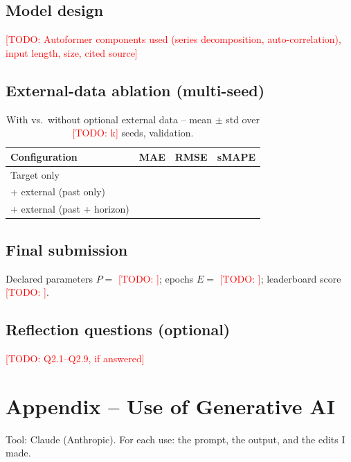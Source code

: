 \documentclass[11pt,a4paper]{article}
\newcommand{\todo}[1]{\textcolor{red}{[TODO: #1]}}
\begin{document}
\subsection*{Model design}
\todo{Autoformer components used (series decomposition, auto-correlation), input length, size, cited source}

\subsection*{External-data ablation (multi-seed)}
\begin{table}[H]\centering\small
\caption{With vs.\ without optional external data -- mean $\pm$ std over \todo{k} seeds, validation.}
\begin{tabular}{lccc}
\toprule
Configuration & MAE & RMSE & sMAPE\\
\midrule
Target only & & & \\
+ external (past only) & & & \\
+ external (past + horizon) & & & \\
\bottomrule
\end{tabular}
\end{table}

\subsection*{Final submission}
Declared parameters $P=$ \todo{}; epochs $E=$ \todo{}; leaderboard score \todo{}.

\subsection*{Reflection questions (optional)}
\todo{Q2.1--Q2.9, if answered}

\clearpage
\appendix
\section*{Appendix -- Use of Generative AI}

\noindent Tool: Claude (Anthropic). For each use: the prompt, the output, and the edits I made.
\end{document}
